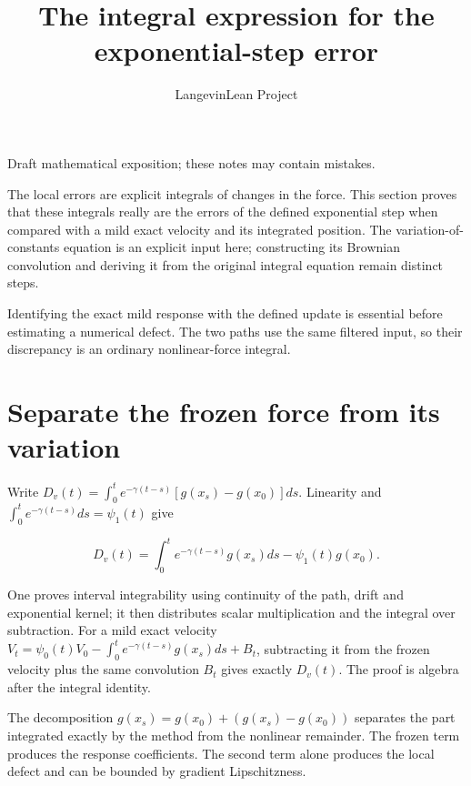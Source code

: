\documentclass[11pt,a4paper]{article}
\title{\texorpdfstring{The integral expression for the exponential-step error}{The integral expression for the exponential-step error}}
\author{LangevinLean Project}
\date{}
\begin{document}
\maketitle
Draft mathematical exposition; these notes may contain mistakes.


The local errors are explicit integrals of changes in the force. This section proves that these integrals really are the errors of the defined exponential step when compared with a mild exact velocity and its integrated position. The variation-of-constants equation is an explicit input here; constructing its Brownian convolution and deriving it from the original integral equation remain distinct steps.



Identifying the exact mild response with the defined update is essential before estimating a numerical defect. The two paths use the same filtered input, so their discrepancy is an ordinary nonlinear-force integral.


\section{\texorpdfstring{Separate the frozen force from its variation}{Separate the frozen force from its variation}}


Write \(D_v(t)=\int_0^t e^{-\gamma(t-s)}[g(x_s)-g(x_0)]ds\). Linearity and \(\int_0^t e^{-\gamma(t-s)}ds=\psi_1(t)\) give

\[D_v(t)=\int_0^t e^{-\gamma(t-s)}g(x_s)ds-\psi_1(t)g(x_0).\]

One proves interval integrability using continuity of the path, drift and exponential kernel; it then distributes scalar multiplication and the integral over subtraction. For a mild exact velocity \(V_t=\psi_0(t)V_0-\int_0^t e^{-\gamma(t-s)}g(x_s)ds+B_t\), subtracting it from the frozen velocity plus the same convolution \(B_t\) gives exactly \(D_v(t)\). The proof is algebra after the integral identity.



The decomposition \(g(x_s)=g(x_0)+(g(x_s)-g(x_0))\) separates the part integrated exactly by the method from the nonlinear remainder. The frozen term produces the response coefficients. The second term alone produces the local defect and can be bounded by gradient Lipschitzness.
\end{document}
